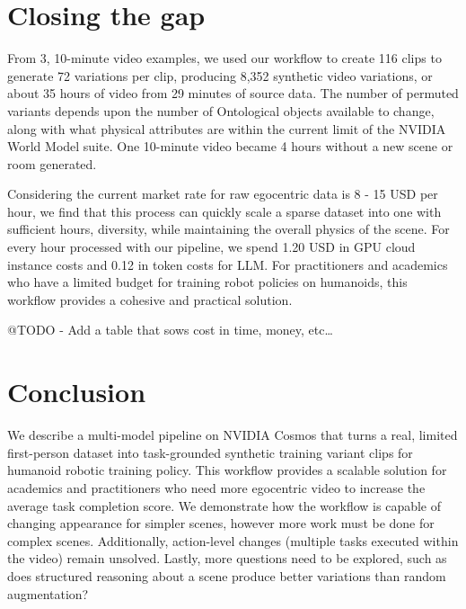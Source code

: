 \documentclass[runningheads]{llncs}
\begin{document}
\section{Closing the gap}

From 3, 10-minute video examples, we used our workflow to create 116 clips to generate 72 variations per clip, producing 8,352 synthetic video variations, or about 35 hours of video from 29 minutes of source data. The number of permuted variants depends upon the number of Ontological objects available to change, along with what physical attributes are within the current limit of the NVIDIA World Model suite. One 10-minute video became 4 hours without a new scene or room generated.

Considering the current market rate for raw egocentric data is 8 - 15 USD per hour, we find that this process can quickly scale a sparse dataset into one with sufficient hours, diversity, while maintaining the overall physics of the scene. For every hour processed with our pipeline, we spend 1.20 USD in GPU cloud instance costs and 0.12 in token costs for LLM. For practitioners and academics who have a limited budget for training robot policies on humanoids, this workflow provides a cohesive and practical solution.

@TODO - Add a table that sows cost in time, money, etc\ldots

\section{Conclusion}

We describe a multi-model pipeline on NVIDIA Cosmos that turns a real, limited first-person dataset into task-grounded synthetic training variant clips for humanoid robotic training policy. This workflow provides a scalable solution for academics and practitioners who need more egocentric video to increase the average task completion score. We demonstrate how the workflow is capable of changing appearance for simpler scenes, however more work must be done for complex scenes. Additionally, action-level changes (multiple tasks executed within the video) remain unsolved. Lastly, more questions need to be explored, such as does structured reasoning about a scene produce better variations than random augmentation?
\end{document}
